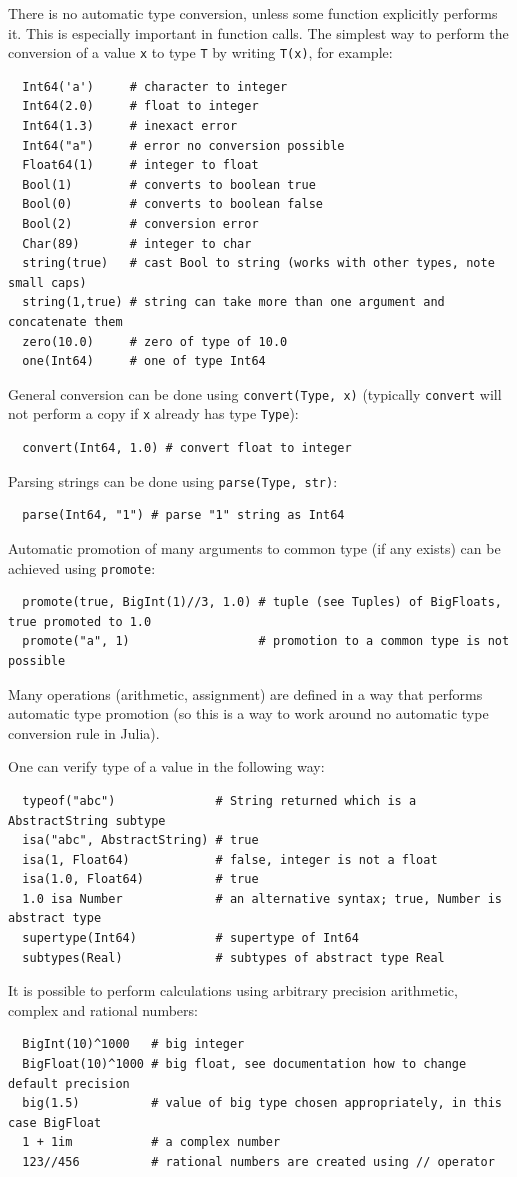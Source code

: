 \documentclass[10pt,a4paper]{article}
\begin{document}
There is no automatic type conversion, unless some function explicitly performs it. This is especially important in function calls. The simplest way to perform the conversion of a value \lstinline|x| to type \lstinline|T| by writing \lstinline|T(x)|, for example:
\begin{lstlisting}
  Int64('a')     # character to integer
  Int64(2.0)     # float to integer
  Int64(1.3)     # inexact error
  Int64("a")     # error no conversion possible
  Float64(1)     # integer to float
  Bool(1)        # converts to boolean true
  Bool(0)        # converts to boolean false
  Bool(2)        # conversion error
  Char(89)       # integer to char
  string(true)   # cast Bool to string (works with other types, note small caps)
  string(1,true) # string can take more than one argument and concatenate them
  zero(10.0)     # zero of type of 10.0
  one(Int64)     # one of type Int64
\end{lstlisting}
General conversion can be done using \lstinline|convert(Type, x)| (typically \lstinline|convert| will not perform a copy if \lstinline|x| already has type \lstinline|Type|):
\begin{lstlisting}
  convert(Int64, 1.0) # convert float to integer
\end{lstlisting}
Parsing strings can be done using \lstinline|parse(Type, str)|:
\begin{lstlisting}
  parse(Int64, "1") # parse "1" string as Int64
\end{lstlisting}
Automatic promotion of many arguments to common type (if any exists) can be achieved using \lstinline|promote|:
\begin{lstlisting}
  promote(true, BigInt(1)//3, 1.0) # tuple (see Tuples) of BigFloats, true promoted to 1.0
  promote("a", 1)                  # promotion to a common type is not possible
\end{lstlisting}
Many operations (arithmetic, assignment) are defined in a way that performs automatic type promotion (so this is a way to work around no automatic type conversion rule in Julia).

One can verify type of a value in the following way:
\begin{lstlisting}
  typeof("abc")              # String returned which is a AbstractString subtype
  isa("abc", AbstractString) # true
  isa(1, Float64)            # false, integer is not a float
  isa(1.0, Float64)          # true
  1.0 isa Number             # an alternative syntax; true, Number is abstract type
  supertype(Int64)           # supertype of Int64
  subtypes(Real)             # subtypes of abstract type Real
\end{lstlisting}
It is possible to perform calculations using arbitrary precision arithmetic, complex and rational numbers:
\begin{lstlisting}
  BigInt(10)^1000   # big integer
  BigFloat(10)^1000 # big float, see documentation how to change default precision
  big(1.5)          # value of big type chosen appropriately, in this case BigFloat
  1 + 1im           # a complex number
  123//456          # rational numbers are created using // operator
\end{lstlisting}
\end{document}
